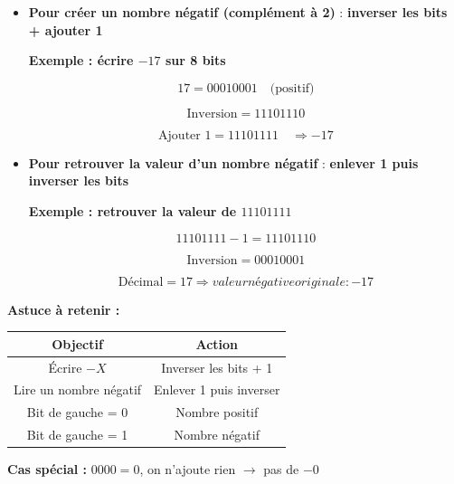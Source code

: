 \documentclass[a4paper,12pt]{article}
\begin{document}
\begin{itemize} 

    \item \textbf{Pour créer un nombre négatif (complément à 2)} : \textbf{inverser les bits + ajouter 1}   

    \textbf{Exemple : écrire $-17$ sur 8 bits}  

\[
17 = 00010001 \quad\text{(positif)} 
\] 

\[
\text{Inversion} = 11101110 
\] 

\[
\text{Ajouter 1} = 11101111 \quad \Rightarrow -17 
\] 

  

    \item \textbf{Pour retrouver la valeur d’un nombre négatif} : \textbf{enlever 1 puis inverser les bits}   

    \textbf{Exemple : retrouver la valeur de $11101111$}  

\[
11101111 - 1 = 11101110 
\] 

\[
\text{Inversion} = 00010001 
\] 

\[
\text{Décimal} = 17 \Rightarrow valeur négative originale : -17 
\] 

\end{itemize} 

  

\textbf{Astuce à retenir :} 

\begin{center} 

\begin{tabular}{|c|c|} 

\hline 

\textbf{Objectif} & \textbf{Action} \\ \hline 

Écrire $-X$ & Inverser les bits + 1 \\ \hline 

Lire un nombre négatif & Enlever 1 puis inverser \\ \hline 

Bit de gauche = 0 & Nombre positif \\ \hline 

Bit de gauche = 1 & Nombre négatif \\ \hline 

\end{tabular} 

\end{center} 

  

\textbf{Cas spécial :} $0000 = 0$, on n’ajoute rien $\rightarrow$ pas de $-0$ 
\end{document}
